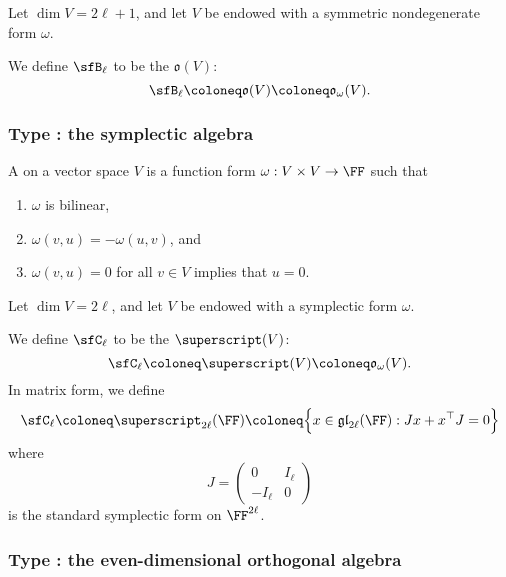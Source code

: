 \documentclass{article}
\newcommand*\gl{\ensuremath{\mathfrak{gl}}}
\let\sp\superscript
\newcommand*\sp{\ensuremath{\mathfrak{sp}}}
\newcommand*\oalg{\ensuremath{\mathfrak{o}}}
\begin{document}
\begin{definition}
    Let $\dim V = 2\ell+1$, and let $V$ be endowed with a symmetric nondegenerate form $\omega$.

    We define $\sfB_\ell$ to be the  $\oalg(V)$:
    \[
        \sfB_\ell
        \coloneq
        \oalg(V)
        \coloneq
        \oalg_\omega(V).
    \]
\end{definition}

\subsubsection{Type \sfC: the symplectic algebra}

\begin{definition}
    A  on a vector space $V$ is a function form $\omega: V \times V \to \FF$ such that
    \begin{enumerate}[label=(\alph*)]
        \item
            $\omega$ is bilinear,
        \item 
            $\omega(v,u) = -\omega(u,v)$, and
        \item 
            $\omega(v,u) = 0$ for all $v \in V$ implies that $u=0$.
    \end{enumerate}
\end{definition}

\begin{definition}
    Let $\dim V = 2\ell$, and let $V$ be endowed with a symplectic form $\omega$.

    We define $\sfC_\ell$ to be the  $\sp(V)$:
    \[
        \sfC_\ell
        \coloneq
        \sp(V)
        \coloneq
        \oalg_\omega(V).
    \]
    In matrix form, we define
    \[
        \sfC_\ell
        \coloneq
        \sp_{2\ell}(\FF)
        \coloneq
        \Big\{
            x \in \gl_{2\ell}(\FF)
            :
            Jx + x^\top J = 0
        \Big\}
    \]
    where
    \[
        J
        =
        \begin{pmatrix}
            0 & I_\ell \\
            -I_\ell & 0
        \end{pmatrix}
    \]
    is the standard symplectic form on $\FF^{2\ell}$.
\end{definition}

\subsubsection{Type \sfD: the even-dimensional orthogonal algebra}
\end{document}
